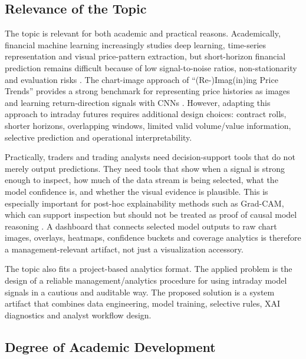 \subsection{Relevance of the Topic}
\label{subsec:relevance}

The topic is relevant for both academic and practical reasons. Academically, financial machine learning increasingly studies deep learning, time-series representation and visual price-pattern extraction, but short-horizon financial prediction remains difficult because of low signal-to-noise ratios, non-stationarity and evaluation risks \cite{lopez_de_prado_afml,sezer_financial_forecasting_survey,lim_zohren_time_series_forecasting}. The chart-image approach of ``(Re-)Imag(in)ing Price Trends'' provides a strong benchmark for representing price histories as images and learning return-direction signals with CNNs \cite{jiang_reimagining_price_trends}. However, adapting this approach to intraday futures requires additional design choices: contract rolls, shorter horizons, overlapping windows, limited valid volume/value information, selective prediction and operational interpretability.

Practically, traders and trading analysts need decision-support tools that do not merely output predictions. They need tools that show when a signal is strong enough to inspect, how much of the data stream is being selected, what the model confidence is, and whether the visual evidence is plausible. This is especially important for post-hoc explainability methods such as Grad-CAM, which can support inspection but should not be treated as proof of causal model reasoning \cite{selvaraju_gradcam,adebayo_sanity_checks,rudin_black_boxes}. A dashboard that connects selected model outputs to raw chart images, overlays, heatmaps, confidence buckets and coverage analytics is therefore a management-relevant artifact, not just a visualization accessory.

The topic also fits a project-based analytics format. The applied problem is the design of a reliable management/analytics procedure for using intraday model signals in a cautious and auditable way. The proposed solution is a system artifact that combines data engineering, model training, selective rules, XAI diagnostics and analyst workflow design.

\subsection{Degree of Academic Development}
\label{subsec:academic_development}

